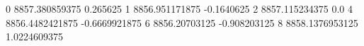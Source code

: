 0 8857.380859375 0.265625
1 8856.951171875 -0.1640625
2 8857.115234375 0.0
4 8856.4482421875 -0.6669921875
6 8856.20703125 -0.908203125
8 8858.1376953125 1.0224609375
